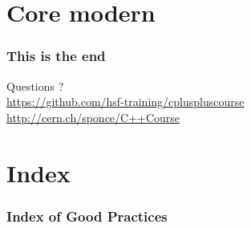 \documentclass[compress]{beamer}
\begin{document}
\section[More]{Core modern \cpp}
 {













}


\begin{frame}
  \frametitle{This is the end}
  \begin{center}
    \Huge Questions ?\\
    \vspace{.5cm}
    \tiny \href{https://github.com/hsf-training/cpluspluscourse}{https://github.com/hsf-training/cpluspluscourse}\\
    \tiny \href{http://cern.ch/sponce/C++Course}{http://cern.ch/sponce/C++Course}
  \end{center}
\end{frame}

\section{Index}

\begin{frame}
  \frametitle{Index of Good Practices}
  \listofgoodpractices
\end{frame}
\end{document}
